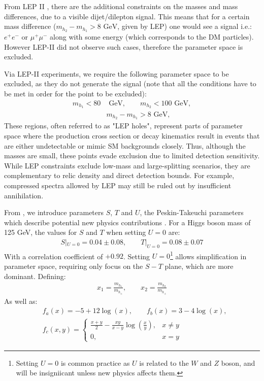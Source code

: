 \documentclass[12pt]{article}
\begin{document}
From LEP II \cite{Lundstr_m_2009}, there are the additional constraints on the masses and mass differences, due to a visible dijet/dilepton signal. This means that for a certain mass difference ($m_{h_2} - m_{h_1} > 8\text{ GeV}$, given by LEP) one would see a signal i.e.: $e^+e^-$ or $\mu^+ \mu^-$ along with some energy (which corresponds to the DM particles). However LEP-II did not observe such cases, therefore the parameter space is excluded. 

Via LEP-II experiments, we require the following parameter space to be excluded, as they do not generate the signal (note that all the conditions have to be met in order for the point to be excluded):
\begin{equation}
    \begin{split}
        m_{h_1} < 80 &\text{ GeV}, \qquad
        m_{h_2} < 100 \text{ GeV},
        \\
        &m_{h_2} - m_{h_1} > 8\text{ GeV},
    \end{split}
\label{LEP-3}
\end{equation}
These regions, often referred to as "LEP holes", represent parts of parameter space where the production cross section or decay kinematics result in events that are either undetectable or mimic SM backgrounds closely. Thus, although the masses are small, these points evade exclusion due to limited detection sensitivity. While LEP constraints exclude low-mass and large-splitting scenarios, they are complementary to relic density and direct detection bounds. For example, compressed spectra allowed by LEP may still be ruled out by insufficient annihilation.

From \cite{gfitter2018}, we introduce parameters $S$, $T$ and $U$, the Peskin-Takeuchi parameters \cite{PeskinTakeuchi1990} which describe potential new physics contributions . For a Higgs boson mass of 125 GeV, the values for $S$ and $T$ when setting $U = 0$ are:
 \begin{align}
     S|_{U=0} = 0.04 \pm0.08, \qquad
     T|_{U=0} = 0.08\pm0.07
 \end{align}
With a correlation coefficient of $+0.92$. Setting $U = 0$\footnote{Setting $U = 0$ is common practice as $U$ is related to the $W$ and $Z$ boson, and will be insigniicant unless new physics affects them.} allows simplification in parameter space, requiring only focus on the $S-T$ plane, which are more dominant. Defining:
\begin{align}
    x_1 = \frac{m_{h_1}}{m_{h_\pm}}, \qquad 
    x_2 = \frac{m_{h_2}}{m_{h_\pm}}
\end{align}
As well as:
\begin{align}
    &f_a(x) = -5 +12\log(x), \qquad f_b(x) = 3-4\log(x),
    \\
    &f_c(x,y) = 
    \begin{cases}
        \frac{x+y}{2}-\frac{xy}{x-y}\log{\left(\frac{x}{y}\right)}, & x\neq y\\
        0, & x = y
    \end{cases}
\end{align}
\end{document}
